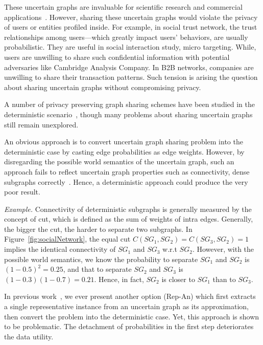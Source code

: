 These uncertain graphs are invaluable for scientific research and commercial applications~\cite{Kempe_Maximizing_2003,Cho_Friendship_2011}. However, sharing these uncertain graphs would violate the privacy of users or entities profiled inside. For example, in social trust network, the trust relationships among users---which  greatly impact users' behaviors, are usually probabilistic.  They are useful in social interaction study, micro targeting. While, users are unwilling to share such confidential information with potential adversaries like Cambridge Analysis Company. In B2B networks, companies are unwilling to share their transaction patterns. Such tension is arising the question about sharing uncertain graphs without compromising privacy. 

A number of privacy preserving graph sharing schemes have been studied in the deterministic scenario~\cite{Liu_Towards_2008,Ying_Randomizing_2008,Wang2011,Liu_Privacy_2009,Nguyen_Anonymizing_2015,Sala_Sharing_2011,Xiao_Differentially_2014,lee2011}, though many problems about sharing uncertain graphs still remain unexplored.

An obvious approach is to convert uncertain graph sharing problem into the deterministic case by casting edge probabilities as edge weights. However, by disregarding the possible world semantics of the uncertain graph, such an approach fails to reflect uncertain graph properties such as connectivity, dense subgraphs correctly~\cite{Zhao_Detecting_2014,Hua_Probabilistic_2010}. Hence, a deterministic approach could produce the very poor result.   

\emph{Example.} {\small Connectivity of deterministic subgraphs is generally measured by the concept of cut, which is defined as the sum of weights of intra edges. Generally, the bigger the cut, the harder to separate two subgraphs. In Figure~\ref{fig:socialNetwork}, the equal cut $C(SG_{1},SG_{2})=C(SG_{3},SG_{2})=1$ implies the identical connectivity of $SG_{1}$ and $SG_{3}$ w.r.t $SG_{2}$. However, with the possible world semantics, we know the probability to separate $SG_{1}$ and $SG_{2}$ is $(1-0.5)^{2}=0.25$, and that to separate $SG_{2}$ and $SG_{3}$ is $(1-0.3)(1-0.7)=0.21$. Hence, in fact, $SG_{2}$ is closer to $SG_{1}$ than to $SG_{3}$.}

In previous work~\cite{Xiao:2018}, we ever present another option (Rep-An) which first extracts a single representative instance from an uncertain graph as its approximation, then convert the problem into the deterministic case.
Yet, this approach is shown to be problematic. The detachment of probabilities in the first step deteriorates the data utility. 

